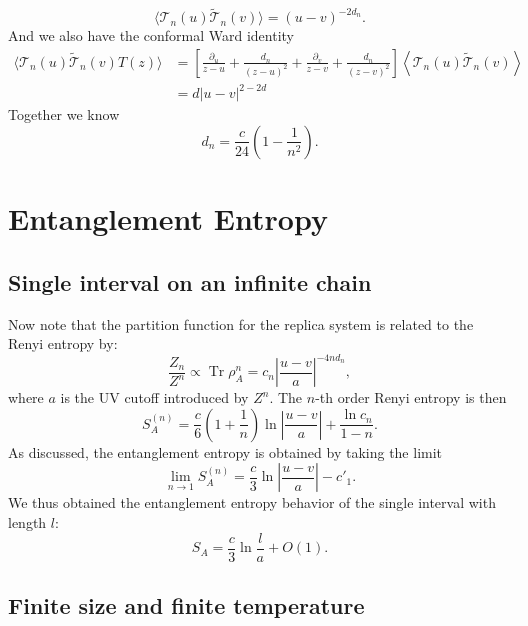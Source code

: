 \documentclass[aps,prb,superscriptaddress,nofootinbib]{revtex4}
\def \Tr{\operatorname{Tr}}
\begin{document}
\begin{equation}
	\langle\mathcal{T}_n(u) \tilde{\mathcal{T}}_n(v) \rangle
	= (u-v)^{-2d_n}.
\end{equation}
And we also have the conformal Ward identity
\begin{equation}
\begin{aligned}
	\langle\mathcal{T}_n(u) \tilde{\mathcal{T}}_n(v) T(z) \rangle
	&= \left[\frac{\partial_u}{z-u} +\frac{d_n}{(z-u)^{2}}+\frac{\partial_v}{z-v} + \frac{d_n}{(z-v)^{2}}\right] \left\langle\mathcal{T}_{n}(u) \tilde{\mathcal{T}}_{n}(v)\right\rangle \\
	&= d|u-v|^{2-2d}
\end{aligned}
\end{equation}
Together we know
\begin{equation}
	d_n = \frac{c}{24}\left(1-\frac{1}{n^2}\right).
\end{equation}

\section{Entanglement Entropy}

\subsection{Single interval on an infinite chain}
Now note that the partition function for the replica system is related to the Renyi entropy by:
\begin{equation}
	\frac{Z_n}{Z^n} \propto \Tr \rho_A^n = c_n \left|\frac{u-v}{a}\right|^{-4n d_n},
\end{equation}
where $a$ is the UV cutoff introduced by $Z^n$.
The $n$-th order Renyi entropy is then
\begin{equation}
	S^{(n)}_A = \frac{c}{6}\left(1+\frac{1}{n}\right) \ln \left|\frac{u-v}{a}\right| + \frac{\ln c_n}{1-n}.
\end{equation}
As discussed, the entanglement entropy is obtained by taking the limit
\begin{equation}
	\lim_{n\rightarrow 1} S^{(n)}_A = \frac{c}{3}\ln\left|\frac{u-v}{a}\right| - c'_1.
\end{equation}
We thus obtained the entanglement entropy behavior of the single interval with length $l$:
\begin{equation}
	S_A = \frac{c}{3}\ln\frac{l}{a} + O(1).
\end{equation}


\subsection{Finite size and finite temperature}
\end{document}
